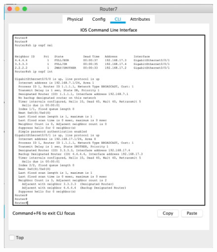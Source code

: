 \documentclass[a4paper,12pt]{article}
\begin{document}
	\begin{figure}[h!]
		\begin{center}
			{\includegraphics[width = \textwidth]{img/7.png}}
			\caption{}
			\label{ris:7}
		\end{center}
	\end{figure}
	
\end{document}
